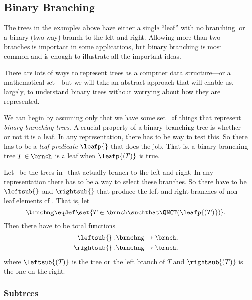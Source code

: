 \begin{definition}
\subsection{Binary Branching}

The trees in the examples above have either a single ``leaf'' with no
branching, or a binary (two-way) branch to the left and right.
Allowing more than two branches is important in some applications, but
binary branching is most common and is enough to illustrate all the
important ideas.

There are lots of ways to represent trees as a computer data
structure---or a mathematical set---but we will take an abstract
approach that will enable us, largely, to understand binary trees
without worrying about how they are represented.

We can begin by assuming only that we have some set \brnch\ of things
that represent \emph{binary branching trees}.  A crucial property of a
binary branching tree is whether or not it is a leaf.  In any
representation, there has to be way to test this.  So there has to be
a \emph{leaf predicate} $\leafp{}$ that does the job.  That is, a
binary branching tree $T \in \brnch$ is a leaf when $\leafp{(T)}$ is
true.

\iffalse
 We define the
\term{leaves} to be elements that $\leafp{}$ picks out:
\[
\leafset \eqdef \set{T \in \brnch \suchthat \leafp{(T)}}.
\]

So the official definition of ``leaf'' is ``element of the set \leafset.''
\fi

Let \brnchng\ be the trees in \brnch\ that actually branch to the left
and right.  In any representation there has to be a way to select
these branches.  So there have to be 
$\leftsub{}$ and $\rightsub{}$ that produce the left and right
branches of non-leaf elements of \brnch.  That is, let
\[
\brnchng \eqdef \set{T \in \brnch \suchthat \QNOT(\leafp{(T)})}.
\]
Then there have to be total functions
\begin{align*}
\leftsub{}: & \brnchng \to \brnch,\\
\rightsub{}:& \brnchng \to \brnch,
\end{align*}
where $\leftsub{(T)}$ is the tree on the left branch of $T$ and
$\rightsub{(T)}$ is the one on the right.

\subsubsection{Subtrees}


\end{definition}
